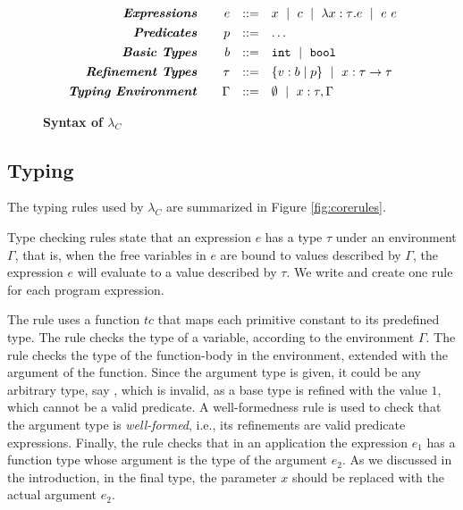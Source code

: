 \begin{figure}[t!]
\centering
$$
\begin{array}{rrcl}
\emphbf{Expressions} \quad 
  & e 
  & ::= 
  &      x 
  \spmid c 
  \spmid \efunt{x}{\tau}{e} 
  \spmid \eapp{e}{e} 
  \\[0.05in] 

\emphbf{Predicates} \quad 
  & p
  & ::= 
  & \dots
  \\[0.05in] 

\emphbf{Basic Types} \quad 
  & b 
  & ::= 
  &      \tbint
  \spmid \tbbool
  \\[0.05in]

\emphbf{Refinement Types} \quad 
  & \tau 
  & ::= 
  &      \tref{b}{p} 
  \spmid \tfun{x}{\tau}{\tau}
  \\[0.05in]

\emphbf{Typing Environment} \quad 
  & \Gamma 
  & ::= 
  &      \emptyset 
  \spmid x:\tau, \Gamma

\end{array}
$$
\caption{\textbf{Syntax of $\lambda_C$}}
\label{fig:coresyntax}
\end{figure}



\subsection{Typing}
The typing rules used by $\lambda_C$ are summarized in Figure \ref{fig:corerules}.

Type checking rules state that
an expression $e$ has a type $\tau$ under an environment $\Gamma$,
that is, when the free variables in $e$ are bound to values described by 
$\Gamma$, the expression $e$ will evaluate to a value described by $\tau$.
We write  and create one rule for each program expression.

The rule \tconst uses a function $tc$ that maps each primitive constant 
to its predefined type.
%
The rule \tvariable checks the type of a variable, according 
to the environment $\Gamma$.
%
The rule \tfunction checks the type of the function-body
in the environment, extended with the argument of the function.
Since the argument type is given, it could be any arbitrary type,
say ,
which is invalid, as a base type is refined with 
the value $1$, which cannot be a valid predicate.
%
A well-formedness rule is used to 
check that the argument type is \textit{well-formed}, 
i.e., its refinements are valid predicate expressions.
%
Finally, the rule \tapp checks that in an application 
the expression $e_1$ has a function type
whose argument is the type of the argument $e_2$.
%
As we discussed in the introduction, in the final type,
the parameter $x$ should be replaced with the actual argument $e_2$.

